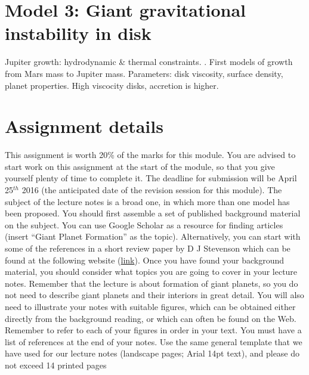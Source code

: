 \documentclass[12pt]{article} %
\begin{document}
\section{Model 3: Giant gravitational instability in disk}\vspace{-2ex}\titlerule[1pt]\bigskip
Jupiter growth: hydrodynamic \& thermal constraints.
\cite{lissauer2009models}. First models of growth from Mars mass to Jupiter mass. Parameters: disk viscosity, surface density, planet properties.\newline
High viscocity disks, accretion is higher.

\clearpage
\section{Assignment details}\vspace{-2ex}\titlerule[1pt]\bigskip

This assignment is worth 20\% of the marks for this module. You are advised to start work on this assignment at the start of the module, so that you give yourself plenty of time to complete it. The deadline for submission will be April 25$^{th}$ 2016 (the anticipated date of the revision session for this module).\newline\linebreak
The subject of the lecture notes is a broad one, in which more than one model has been proposed. You should first assemble a set of published background material on the subject. You can use Google Scholar as a resource for finding articles (insert “Giant Planet Formation” as the topic). Alternatively, you can start with some of the references in a short review paper by D J Stevenson which can be found at the following website (\href{http://authors.library.caltech.edu/9922/1/STEaipcp04.pdf}{link}).\newline \linebreak
Once you have found your background material, you should consider what topics you are going to cover in your lecture notes. Remember that the lecture is about formation of giant planets, so you do not need to describe giant planets and their interiors in great detail. You will also need to illustrate your notes with suitable figures, which can be obtained either directly from the background reading, or which can often be found on the Web. Remember to refer to each of your figures in order in your text. You must have a list of references at the end of your notes.\newline\linebreak
Use the same general template that we have used for our lecture notes (landscape pages; Arial 14pt text), and please do not exceed 14 printed pages



\newpage

\end{document}
